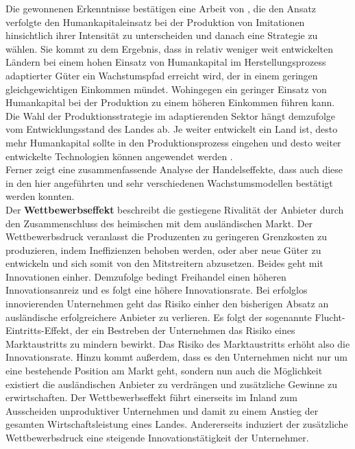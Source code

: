 Die gewonnenen Erkenntnisse best{\"a}tigen eine Arbeit von \citet{Mies.2013}, die den Ansatz verfolgte den Humankapitaleinsatz bei der Produktion von Imitationen hinsichtlich ihrer Intensit{\"a}t zu unterscheiden und danach eine Strategie zu w{\"a}hlen. Sie kommt zu dem Ergebnis, dass in relativ weniger weit entwickelten L{\"a}ndern bei einem hohen Einsatz von Humankapital im Herstellungsprozess adaptierter G{\"u}ter ein Wachstumspfad erreicht wird, der in einem geringen gleichgewichtigen Einkommen m{\"u}ndet. Wohingegen ein geringer Einsatz von Humankapital bei der Produktion zu einem h{\"o}heren Einkommen f{\"u}hren kann. Die Wahl der Produktionsstrategie im adaptierenden Sektor h{\"a}ngt demzufolge vom Entwicklungsstand des Landes ab. Je weiter entwickelt ein Land ist, desto mehr Humankapital sollte in den Produktionsprozess eingehen und desto weiter entwickelte Technologien k{\"o}nnen angewendet werden \citep{Mies.2013}.\\
Ferner zeigt eine zusammenfassende Analyse der Handelseffekte, dass auch diese in den hier angef{\"u}hrten und sehr verschiedenen Wachstumsmodellen best{\"a}tigt werden konnten.\\


Der \textbf{Wettbewerbseffekt} beschreibt die gestiegene Rivalit{\"a}t der Anbieter durch den Zusammenschluss des heimischen mit dem ausl{\"a}ndischen Markt. Der Wettbewerbsdruck veranlasst die Produzenten zu geringeren Grenzkosten zu produzieren, indem Ineffizienzen behoben werden, oder aber neue G{\"u}ter zu entwickeln und sich somit von den Mitstreitern abzusetzen. Beides geht mit Innovationen einher. Demzufolge bedingt Freihandel einen h{\"o}heren Innovationsanreiz und es folgt eine h{\"o}here Innovationsrate. \newline Bei erfolglos innovierenden Unternehmen geht das Risiko einher den bisherigen Absatz an ausl{\"a}ndische erfolgreichere Anbieter zu verlieren. Es folgt der sogenannte Flucht-Eintritts-Effekt, der ein Bestreben der Unternehmen das Risiko eines Marktaustritts zu mindern bewirkt. Das Risiko des Marktaustritts erh{\"o}ht also die Innovationsrate. Hinzu kommt au{\ss}erdem, dass es den Unternehmen nicht nur um eine bestehende Position am Markt geht, sondern nun auch die M{\"o}glichkeit existiert die ausl{\"a}ndischen Anbieter zu verdr{\"a}ngen und zus{\"a}tzliche Gewinne zu erwirtschaften. \newline Der Wettbewerbseffekt f{\"u}hrt einerseits im Inland zum Ausscheiden unproduktiver Unternehmen und damit zu einem Anstieg der gesamten Wirtschaftsleistung eines Landes. Andererseits induziert der zus{\"a}tzliche Wettbewerbsdruck eine steigende Innovationst{\"a}tigkeit der Unternehmer. \newline 


